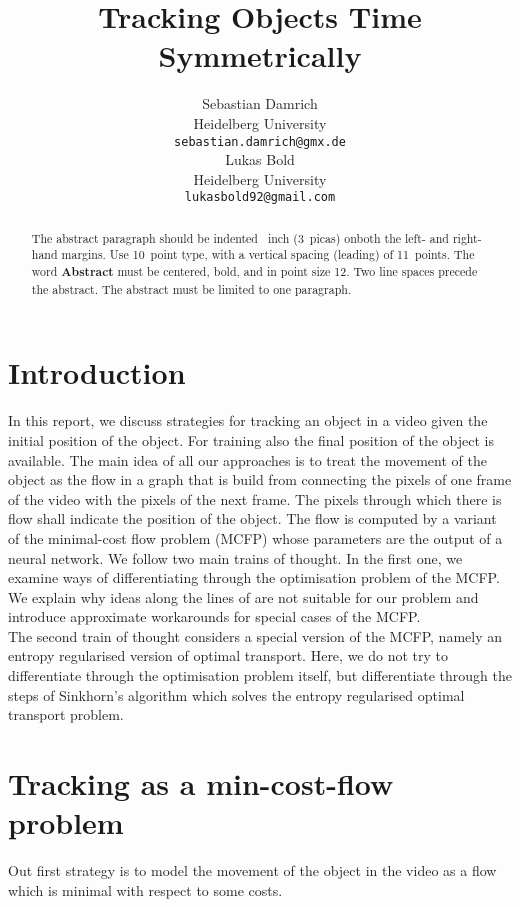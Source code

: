 \documentclass{article}
\title{Tracking Objects Time Symmetrically}
\author{
	Sebastian Damrich 
    \\
  Heidelberg University\\
  \texttt{sebastian.damrich@gmx.de} \\
   \And
   Lukas Bold  \\
   Heidelberg University \\
  \texttt{lukasbold92@gmail.com} \\
}
\begin{document}

\maketitle

\begin{abstract}
  The abstract paragraph should be indented ~inch
  (3~picas) onboth the left- and right-hand margins. Use 10~point
  type, with a vertical spacing (leading) of 11~points.  The word
  \textbf{Abstract} must be centered, bold, and in point size 12. Two
  line spaces precede the abstract. The abstract must be limited to
  one paragraph.
\end{abstract}


\section{Introduction}
In this report, we discuss strategies for tracking an object in a video given the initial position of the object. For training also the final position of the object is available. The main idea of all our approaches is to treat the movement of the object as the flow in a graph that is build from connecting the pixels of one frame of the video with the pixels of the next frame. The pixels through which there is flow shall indicate the position of the object. The flow is computed by a variant of the minimal-cost flow problem (MCFP) whose parameters are the output of a neural network. We follow two main trains of thought. In the first one, we examine ways of differentiating through the optimisation problem of the MCFP. We explain why ideas along the lines of \cite{AmosK17} are not suitable for our problem and introduce approximate workarounds for special cases of the MCFP.\\
The second train of thought considers a special version of the MCFP, namely an entropy regularised version of optimal transport. Here, we do not try to differentiate through the optimisation problem itself, but differentiate through the steps of Sinkhorn's algorithm which solves the entropy regularised optimal transport problem.


\section{Tracking as a min-cost-flow problem}
Out first strategy is to model the movement of the object in the video as a flow which is minimal with respect to some costs.
\end{document}

